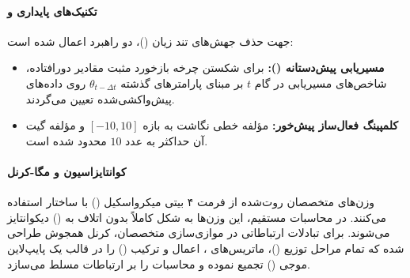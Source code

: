 \paragraph*{تکنیک‌های پایداری  و }
جهت حذف جهش‌های تند زیان ()، دو راهبرد اعمال شده است:
\begin{itemize}
    \item \textbf{مسیریابی پیش‌دستانه ():} برای شکستن چرخه بازخورد مثبت مقادیر دورافتاده، شاخص‌های مسیریابی در گام $t$ بر مبنای پارامترهای گذشته $\theta_{t-\Delta t}$ روی داده‌های پیش‌واکشی‌شده تعیین می‌گردند.
    \item \textbf{کلمپینگ فعال‌ساز پیش‌خور:} مؤلفه خطی نگاشت  به بازه $[-10, 10]$ و مؤلفه گیت آن حداکثر به عدد $10$ محدود شده است.
\end{itemize}

\paragraph*{کوانتایزاسیون  و مگا-کرنل }
وزن‌های متخصصان روت‌شده از فرمت ۴ بیتی میکرواسکیل () با ساختار  استفاده می‌کنند. در محاسبات مستقیم، این وزن‌ها به شکل کاملاً بدون اتلاف به  () دیکوانتایز می‌شوند. برای تبادلات ارتباطاتی در موازی‌سازی متخصصان، کرنل همجوش  طراحی شده که تمام مراحل توزیع ()، ماتریس‌های ، اعمال  و ترکیب () را در قالب یک پایپ‌لاین موجی () تجمیع نموده و محاسبات را بر ارتباطات مسلط می‌سازد.


